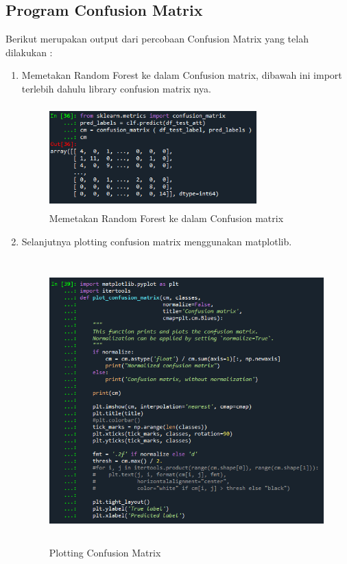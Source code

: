 \subsection{Program Confusion Matrix}
Berikut merupakan output dari percobaan Confusion Matrix yang telah dilakukan :
\begin{enumerate}
    \item Memetakan Random Forest ke dalam Confusion matrix, dibawah ini import terlebih dahulu library confusion matrix nya.
    \begin{figure}[!htbp]
        \centering
        \includegraphics[width=8cm,height=4cm]{figures/membuat_cm.png}
        \caption{Memetakan Random Forest ke dalam Confusion matrix}
        \label{penanda}
    \end{figure}

    \item Selanjutnya plotting confusion matrix menggunakan matplotlib.
    \begin{figure}[!htbp]
        \centering
        \includegraphics[width=11cm,height=11cm]{figures/plot_cm.png}
        \caption{Plotting Confusion Matrix}
        \label{penanda}
    \end{figure}
    

\end{enumerate}
